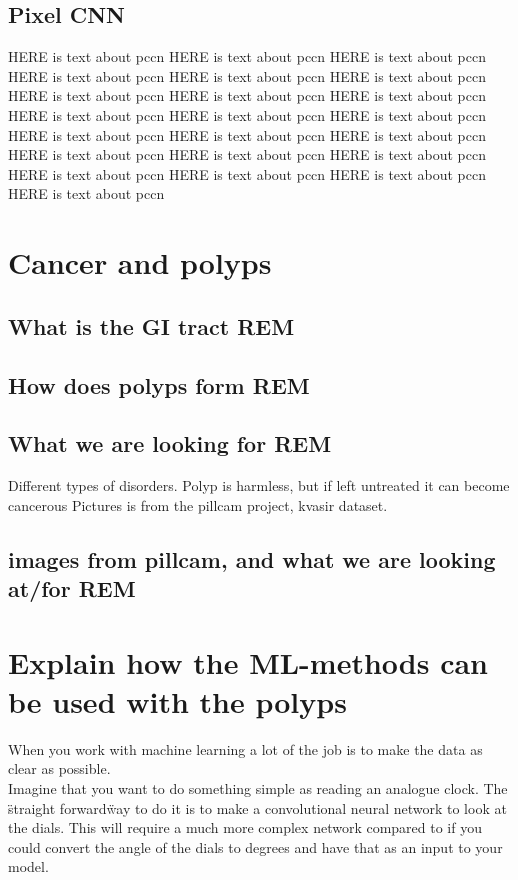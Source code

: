     
    \subsection{Pixel CNN}
      HERE is text about pccn
      HERE is text about pccn
      HERE is text about pccn
      HERE is text about pccn
      HERE is text about pccn
      HERE is text about pccn
      HERE is text about pccn
      HERE is text about pccn
      HERE is text about pccn
      HERE is text about pccn
      HERE is text about pccn
      HERE is text about pccn
      HERE is text about pccn
      HERE is text about pccn
      HERE is text about pccn
      HERE is text about pccn
      HERE is text about pccn
      HERE is text about pccn
      HERE is text about pccn
      HERE is text about pccn
      HERE is text about pccn
      HERE is text about pccn
    


\section{Cancer and polyps}
	  \subsection{What is the GI tract REM}
	  \subsection{How does polyps form REM}
	  \subsection{What we are looking for REM}
	  Different types of disorders.
	  Polyp is harmless, but if left untreated it can become cancerous
	  Pictures is from the pillcam project, kvasir dataset.
	  \subsection{images from pillcam, and what we are looking at/for REM}
	  

	  
	  

	    
	  
\section{Explain how the ML-methods can be used with the polyps}
	When you work with machine learning a lot of the job is to make the data as clear as possible. \\
	Imagine that you want to do something simple as reading an analogue clock. The \"straight forward\" way to do it is to  
	make a convolutional neural network to look at the dials. This will require a much more complex network compared to if you could convert the angle of the dials
	to degrees and have that as an input to your model.

